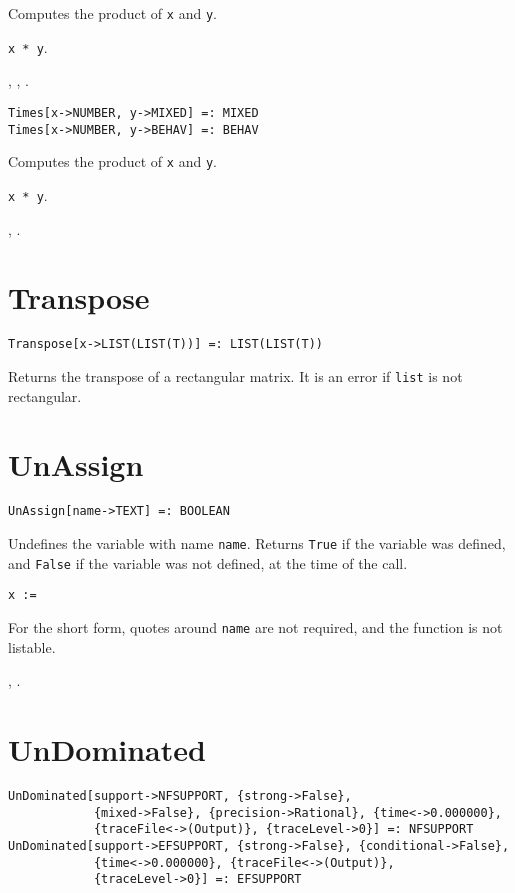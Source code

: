 \noindent
Computes the product of \verb+x+ and \verb+y+.

\shortform \verb+x * y+.

\seealso {}, ,
.

\newsignature

\begin{verbatim}
Times[x->NUMBER, y->MIXED] =: MIXED 
Times[x->NUMBER, y->BEHAV] =: BEHAV 
\end{verbatim}

\noindent
Computes the product of \verb+x+ and \verb+y+.

\shortform \verb+x * y+.

\seealso {}, .


\section*{Transpose}\label{PrimTranspose}
\begin{verbatim} 
Transpose[x->LIST(LIST(T))] =: LIST(LIST(T)) 
\end{verbatim}
\foralltypes

\noindent
Returns the transpose of a rectangular matrix.  It is an error if \texttt{list}
is not rectangular.


\section*{UnAssign}\label{PrimUnAssign}
\begin{verbatim}
UnAssign[name->TEXT] =: BOOLEAN
\end{verbatim}

\noindent
Undefines the variable with name \verb+name+.  Returns 
\verb+True+ if the variable was defined, and \verb+False+ if the
variable was not defined, at the time of the call.

\shortform \verb+x := +

\note For the short form, quotes around \verb+name+ are not
required, and the function is not listable.

\seealso {}, .


\section*{UnDominated}\label{PrimUnDominated}
\begin{verbatim}
UnDominated[support->NFSUPPORT, {strong->False}, 
            {mixed->False}, {precision->Rational}, {time<->0.000000}, 
            {traceFile<->(Output)}, {traceLevel->0}] =: NFSUPPORT 
UnDominated[support->EFSUPPORT, {strong->False}, {conditional->False}, 
            {time<->0.000000}, {traceFile<->(Output)}, 
            {traceLevel->0}] =: EFSUPPORT 
\end{verbatim}

